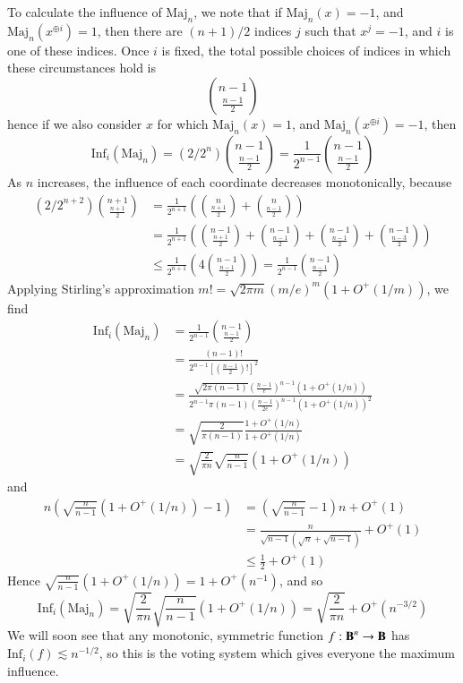 \begin{example}
    To calculate the influence of $\text{Maj}_n$, we note that if $\text{Maj}_n(x) = -1$, and $\text{Maj}_n(x^{\oplus i}) = 1$, then there are $(n+1)/2$ indices $j$ such that $x^j = -1$, and $i$ is one of these indices. Once $i$ is fixed, the total possible choices of indices in which these circumstances hold is
    \[ {n - 1 \choose \frac{n-1}{2}} \]
    hence if we also consider $x$ for which $\text{Maj}_n(x) = 1$, and $\text{Maj}_n(x^{\oplus i}) = -1$, then
    \[ \text{Inf}_i(\text{Maj}_n) = (2/2^n) {n-1 \choose \frac{n-1}{2}} = \frac{1}{2^{n-1}} {n-1 \choose \frac{n-1}{2}} \]
    As $n$ increases, the influence of each coordinate decreases monotonically, because
    \begin{align*}
        (2/2^{n+2}) {n+1 \choose \frac{n+1}{2}} &= \frac{1}{2^{n+1}} \left( {n \choose \frac{n+1}{2}} + {n \choose \frac{n-1}{2}} \right)\\
        &= \frac{1}{2^{n+1}} \left( {n-1 \choose \frac{n+1}{2}} + {n-1 \choose \frac{n-1}{2}} + {n-1 \choose \frac{n-1}{2}} + {n-1 \choose \frac{n-3}{2}} \right)\\
        &\leq \frac{1}{2^{n+1}} \left( 4 {n-1 \choose \frac{n-1}{2}} \right) = \frac{1}{2^{n-1}} {n-1 \choose \frac{n-1}{2}}
    \end{align*}
    Applying Stirling's approximation $m! = \sqrt{2 \pi m} (m/e)^m (1 + O^+(1/m))$, we find
    \begin{align*}
        \text{Inf}_i(\text{Maj}_n) &= \frac{1}{2^{n-1}} {n-1 \choose \frac{n-1}{2}}\\
        &= \frac{(n-1)!}{2^{n-1} \left[ \left( \frac{n-1}{2} \right)! \right]^2}\\
        &= \frac{\sqrt{2\pi(n-1)} \left( \frac{n-1}{e} \right)^{n-1} (1 + O^+(1/n))}{2^{n-1} \pi(n-1) \left( \frac{n-1}{2e} \right)^{n-1} (1 + O^+(1/n))^2}\\
        &= \sqrt{\frac{2}{\pi(n-1)}} \frac{1 + O^+(1/n)}{1 + O^+(1/n)}\\
        &= \sqrt{\frac{2}{\pi n}} \sqrt{\frac{n}{n-1}} (1 + O^+(1/n))
    \end{align*}
    and
    \begin{align*}
        n \left( \sqrt{\frac{n}{n-1}} (1 + O^+(1/n)) - 1 \right) &= \left( \sqrt{\frac{n}{n-1}} - 1 \right) n +  O^+(1)\\
        &= \frac{n}{\sqrt{n-1} (\sqrt{n} + \sqrt{n-1})} + O^+(1)\\
        &\leq \frac{1}{2} + O^+(1)
    \end{align*}
    Hence $\sqrt{\frac{n}{n-1}} (1 + O^+(1/n)) = 1 + O^+(n^{-1})$, and so
    \[ \text{Inf}_i(\text{Maj}_n) = \sqrt{\frac{2}{\pi n}} \sqrt{\frac{n}{n-1}} (1 + O^+(1/n)) = \sqrt{\frac{2}{\pi n}} + O^+(n^{-3/2}) \]
    We will soon see that any monotonic, symmetric function $f: \operatorname{\mathbf{B}}^n \to \operatorname{\mathbf{B}}$ has $\text{Inf}_i(f) \lesssim n^{-1/2}$, so this is the voting system which gives everyone the maximum influence.
\end{example}

